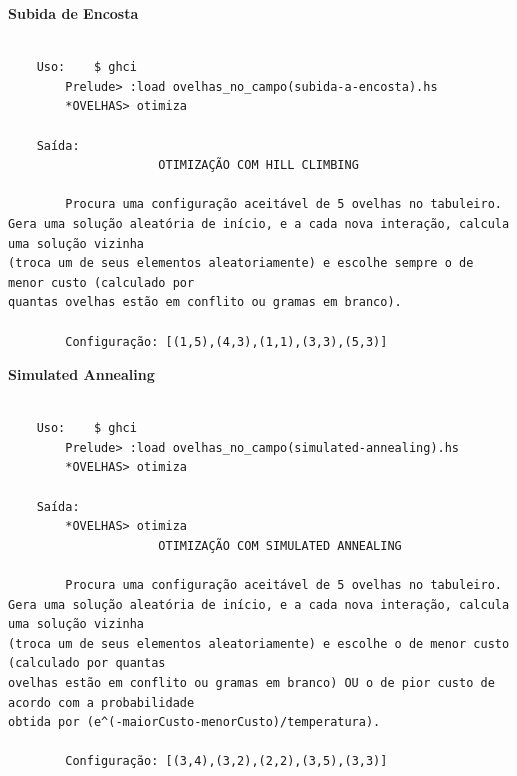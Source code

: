 \documentclass[10pt]{article}
\begin{document}
\vspace{10mm}
\textbf{Subida de Encosta}
\begin{verbatim}

	Uso:	$ ghci
		Prelude> :load ovelhas_no_campo(subida-a-encosta).hs
		*OVELHAS> otimiza

	Saída:
				     OTIMIZAÇÃO COM HILL CLIMBING

		Procura uma configuração aceitável de 5 ovelhas no tabuleiro. 
Gera uma solução aleatória de início, e a cada nova interação, calcula uma solução vizinha 
(troca um de seus elementos aleatoriamente) e escolhe sempre o de menor custo (calculado por 
quantas ovelhas estão em conflito ou gramas em branco).

		Configuração: [(1,5),(4,3),(1,1),(3,3),(5,3)]

\end{verbatim}

\pagebreak
\textbf{Simulated Annealing}
\begin{verbatim}

	Uso:	$ ghci
		Prelude> :load ovelhas_no_campo(simulated-annealing).hs
		*OVELHAS> otimiza

	Saída:
		*OVELHAS> otimiza
				     OTIMIZAÇÃO COM SIMULATED ANNEALING

		Procura uma configuração aceitável de 5 ovelhas no tabuleiro.
Gera uma solução aleatória de início, e a cada nova interação, calcula uma solução vizinha 
(troca um de seus elementos aleatoriamente) e escolhe o de menor custo (calculado por quantas 
ovelhas estão em conflito ou gramas em branco) OU o de pior custo de acordo com a probabilidade 
obtida por (e^(-maiorCusto-menorCusto)/temperatura).

		Configuração: [(3,4),(3,2),(2,2),(3,5),(3,3)]

\end{verbatim}
\end{document}
